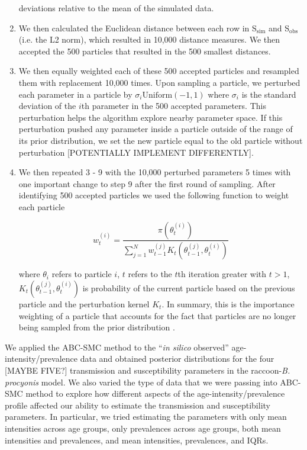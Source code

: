 \documentclass[11pt]{article}
\begin{document}
\begin{enumerate}
  deviations relative to the mean of the simulated data.
\item
  We then calculated the Euclidean distance between each row in S$_\text{sim}$
  and S$_\text{obs}$ (i.e. the L2 norm), which resulted in 10,000 distance
  measures. We then accepted the 500 particles that resulted in the
  500 smallest distances.
\item
  We then equally weighted each of these 500 accepted particles and
  resampled them with replacement 10,000 times. Upon sampling a
  particle, we perturbed each parameter in a particle by
 $\sigma_i \text{Uniform}(-1, 1)$ where $\sigma_i$ is the standard
  deviation of the $i$th parameter in the 500 accepted parameters. This
  perturbation helps the algorithm explore nearby parameter space. If this perturbation pushed any parameter inside a particle outside of the range of its prior distribution, we set the new particle equal to the old particle without perturbation [POTENTIALLY IMPLEMENT DIFFERENTLY].
\item
  We then repeated 3 - 9 with the 10,000 perturbed parameters 5
  times with one important change to step 9 after the first round of
  sampling. After identifying 500 accepted particles we used the
  following function to weight each particle \citep{Toni2009}

  \begin{equation}
    w_t^{(i)} = \dfrac{\pi(\theta_t^{(i)})}{\sum_{j = 1}^N w_{t - 1}^{(j)} K_t(\theta_{t - 1}^{(j)}, \theta_t^{(i)})}
  \end{equation}

  where $\theta_i$ refers to particle $i$, $t$ refers to the $t$th iteration greater with $t > 1$,  $K_t(\theta_{t - 1}^{(j)}, \theta_t^{(i)})$ is probability of the current particle based on the previous particle and the perturbation kernel $K_t$. 
  In summary, this is the
  importance weighting of a particle that accounts for the fact that
  particles are no longer being sampled from the prior distribution \citep{Beaumont2010}.
\end{enumerate}

We applied the ABC-SMC method to the ``\emph{in silico} observed'' age-intensity/prevalence data and obtained posterior distributions for the four [MAYBE FIVE?]
transmission and susceptibility parameters in the raccoon-\emph{B.
procyonis} model.  We also varied the type of data that we were passing into ABC-SMC method to explore how different aspects of the age-intensity/prevalence profile affected our ability to estimate the transmission and susceptibility parameters.  In particular, we tried estimating the parameters with only mean intensities across age groups, only prevalences across age groups, both mean intensities and prevalences, and mean intensities, prevalences, and IQRs. 
\end{document}
